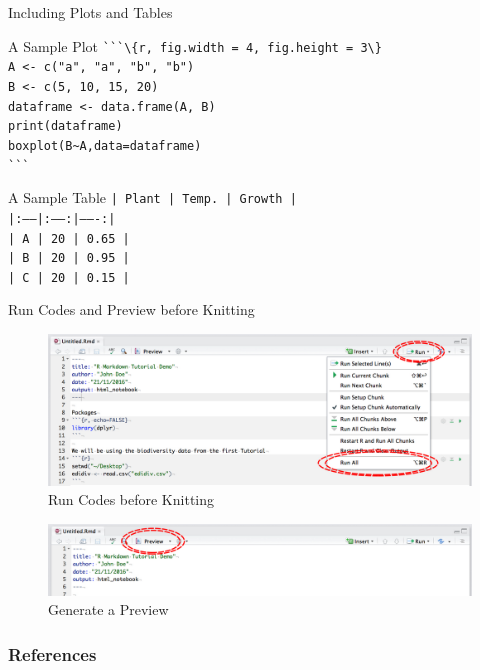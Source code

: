 \documentclass[9pt,handout]{beamer}
\newcommand{\skipv}{\vspace{8pt}}
\begin{document}
\begin{frame}{Including Plots and Tables}

    \begin{block}{A Sample Plot}
        \quad    \Verb|```\{r, fig.width = 4, fig.height = 3\}| \\
        \quad    \Verb|A <- c("a", "a", "b", "b")| \\
        \quad    \Verb|B <- c(5, 10, 15, 20)| \\
        \quad    \Verb|dataframe <- data.frame(A, B)| \\
        \quad    \Verb|print(dataframe)| \\
        \quad    \Verb|boxplot(B~A,data=dataframe)| \\
        \quad    \Verb|```|
    \end{block}
    \skipv
    \begin{block}{A Sample Table}
        \quad    \texttt{| Plant | Temp. | Growth |}\\
        \quad    \texttt{|:------|:-----:|-------:|}\\
        \quad    \texttt{| A     | 20    | 0.65   |}\\
        \quad    \texttt{| B     | 20    | 0.95   |}\\
        \quad    \texttt{| C     | 20    | 0.15   |}
    \end{block}
\end{frame}

\begin{frame}{Run Codes and Preview before Knitting}
    \begin{figure}
    \includegraphics[width=\textwidth]{Notebook_Run.jpg}
    \caption{Run Codes before Knitting}
    \end{figure}
    \begin{figure}
    \includegraphics[width=\textwidth]{Notebook_Preview.jpg}
    \caption{Generate a Preview}
    \end{figure}
\end{frame}

\begin{frame}[allowframebreaks]
    \frametitle{References}
    
    
\end{frame}
\end{document}
